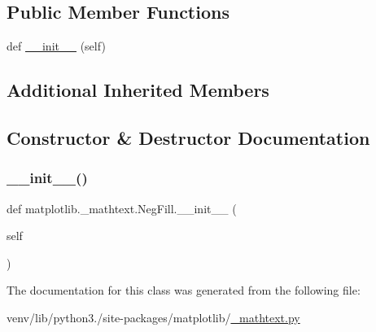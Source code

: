 \subsection*{Public Member Functions}
\begin{DoxyCompactItemize}
\item 
def \hyperlink{classmatplotlib_1_1__mathtext_1_1NegFill_a5f2033d18e7fde2b71fcda25e489b543}{\+\_\+\+\_\+init\+\_\+\+\_\+} (self)
\end{DoxyCompactItemize}
\subsection*{Additional Inherited Members}


\subsection{Constructor \& Destructor Documentation}
\mbox{\label{classmatplotlib_1_1__mathtext_1_1NegFill_a5f2033d18e7fde2b71fcda25e489b543}} 
\subsubsection{\texorpdfstring{\+\_\+\+\_\+init\+\_\+\+\_\+()}{\_\_init\_\_()}}
{\footnotesize\ttfamily def matplotlib.\+\_\+mathtext.\+Neg\+Fill.\+\_\+\+\_\+init\+\_\+\+\_\+ (\begin{DoxyParamCaption}\item[{}]{self }\end{DoxyParamCaption})}



The documentation for this class was generated from the following file\+:\begin{DoxyCompactItemize}
\item 
venv/lib/python3./site-\/packages/matplotlib/\hyperlink{__mathtext_8py}{\+\_\+mathtext.\+py}\end{DoxyCompactItemize}
